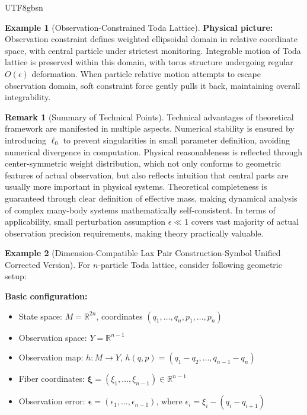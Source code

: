 \documentclass[a4paper,12pt]{extarticle}
\theoremstyle{definition}
\newtheorem{example}{Example}
\newtheorem{remark}{Remark}
\begin{document}
\begin{CJK}{UTF8}{gbsn}
\begin{example}[Observation-Constrained Toda Lattice]
\textbf{Physical picture:}
Observation constraint defines weighted ellipsoidal domain in relative coordinate space, with central particle under strictest monitoring. Integrable motion of Toda lattice is preserved within this domain, with torus structure undergoing regular $O(\epsilon)$ deformation. When particle relative motion attempts to escape observation domain, soft constraint force gently pulls it back, maintaining overall integrability.

\begin{remark}[Summary of Technical Points]
Technical advantages of theoretical framework are manifested in multiple aspects. Numerical stability is ensured by introducing $\ell_0$ to prevent singularities in small parameter definition, avoiding numerical divergence in computation. Physical reasonableness is reflected through center-symmetric weight distribution, which not only conforms to geometric features of actual observation, but also reflects intuition that central parts are usually more important in physical systems. Theoretical completeness is guaranteed through clear definition of effective mass, making dynamical analysis of complex many-body systems mathematically self-consistent. In terms of applicability, small perturbation assumption $\epsilon \ll 1$ covers vast majority of actual observation precision requirements, making theory practically valuable.
\end{remark}
\end{example}

\begin{example}[Dimension-Compatible Lax Pair Construction-Symbol Unified Corrected Version]
For $n$-particle Toda lattice, consider following geometric setup:

\textbf{Basic configuration:}
\begin{itemize}
\item State space: $M = \mathbb{R}^{2n}$, coordinates $(q_1, \ldots, q_n, p_1, \ldots, p_n)$
\item Observation space: $Y = \mathbb{R}^{n-1}$
\item Observation map: $h: M \to Y$, $h(q,p) = (q_1 - q_2, \ldots, q_{n-1} - q_n)$
\item Fiber coordinates: $\boldsymbol{\xi} = (\xi_1, \ldots, \xi_{n-1}) \in \mathbb{R}^{n-1}$
\item Observation error: $\boldsymbol{\epsilon} = (\epsilon_1, \ldots, \epsilon_{n-1})$, where $\epsilon_i = \xi_i - (q_i - q_{i+1})$
\end{itemize}


\end{example}
\end{CJK}
\end{document}
